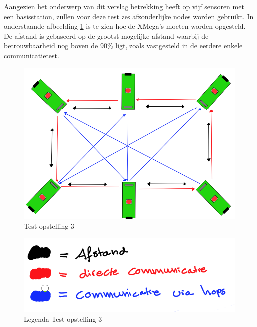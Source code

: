 Aangezien het onderwerp van dit verslag betrekking heeft op vijf sensoren met een basisstation, zullen voor deze test zes afzonderlijke nodes worden gebruikt. In onderstaande afbeelding \ref{fig:TestTotCom} is te zien hoe de XMega's moeten worden opgesteld. De afstand is gebaseerd op de grootst mogelijke afstand waarbij de betrouwbaarheid nog boven de 90\% ligt, zoals vastgesteld in de eerdere enkele communicatietest.

\begin{figure}[h]
    \centering
    \includegraphics[scale = 0.3]{img/test3.png}
    \caption{Test opstelling 3}
    \label{fig:TestTotCom}
\end{figure}

\begin{figure}[h]
    \centering
    \includegraphics[scale = 0.3]{img/legenda_test3.png}
    \caption{Legenda Test opstelling 3}
    \label{fig:TestTotComLeg}
\end{figure}

